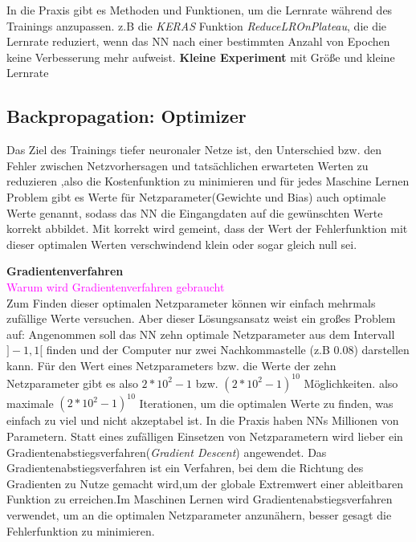 \documentclass[12pt,a4paper]{scrartcl}
\numberwithin{equation}{section}
\begin{document}
In die Praxis gibt es Methoden und Funktionen, um die Lernrate während des Trainings anzupassen. z.B die \textit{KERAS} Funktion \textit{ReduceLROnPlateau}, die die Lernrate reduziert, wenn das \ac{NN} nach einer bestimmten Anzahl von Epochen keine Verbesserung mehr aufweist.
\textcolor{RubineRed}{\textbf{Kleine Experiment} mit Größe und kleine Lernrate}

\subsection{Backpropagation: Optimizer}

Das Ziel des Trainings tiefer neuronaler Netze ist, den Unterschied bzw. den Fehler zwischen Netzvorhersagen und tatsächlichen erwarteten Werten zu reduzieren ,also die Kostenfunktion zu minimieren und für jedes Maschine Lernen Problem gibt es Werte für Netzparameter(Gewichte und Bias) auch optimale Werte genannt, sodass das \ac{NN} die Eingangdaten auf die gewünschten Werte korrekt abbildet. Mit korrekt wird gemeint, dass der Wert der Fehlerfunktion mit dieser optimalen Werten verschwindend klein oder sogar gleich null sei.

\textbf{Gradientenverfahren}\\
\textcolor{magenta}{Warum wird Gradientenverfahren gebraucht}\\
Zum Finden dieser optimalen Netzparameter können wir einfach mehrmals zufällige Werte versuchen. Aber dieser Lösungsansatz weist ein großes Problem auf: Angenommen soll das NN zehn optimale Netzparameter aus dem Intervall  $ ]-1,1[ $ finden und der Computer nur zwei Nachkommastelle (z.B 0.08) darstellen kann. Für den Wert eines Netzparameters bzw. die Werte der zehn Netzparameter gibt es also $ 2*10^2 - 1 $ bzw. $ (2*10^2 - 1)^{10} $ Möglichkeiten. also maximale  $ (2*10^2 - 1)^10 $ Iterationen, um die optimalen Werte zu finden, was einfach zu viel und nicht akzeptabel ist. In die Praxis haben \acsp{NN} Millionen von Parametern.
Statt eines zufälligen Einsetzen von Netzparametern wird lieber ein Gradientenabstiegsverfahren(\textit{Gradient Descent}) angewendet. Das Gradientenabstiegsverfahren ist ein Verfahren, bei dem die Richtung des Gradienten zu Nutze gemacht wird,um der globale Extremwert einer ableitbaren Funktion zu erreichen.Im Maschinen Lernen wird Gradientenabstiegsverfahren verwendet, um an die optimalen Netzparameter anzunähern, besser gesagt die Fehlerfunktion zu minimieren.
\end{document}
